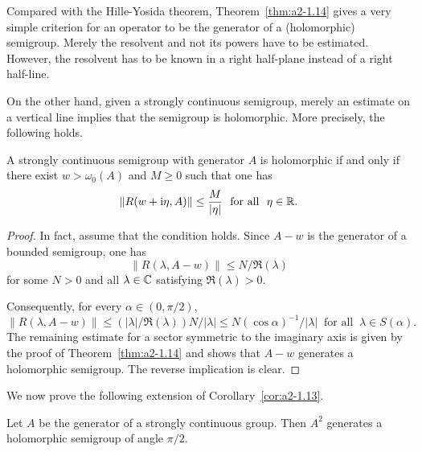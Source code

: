 Compared with the Hille-Yosida theorem, Theorem~\ref{thm:a2-1.14}   gives a very simple criterion for an operator to be the generator of a (holomorphic) semigroup.
Merely the resolvent and not its powers have to be
estimated.
However, the resolvent has to be known in a right half-plane instead of a right half-line.

On the other hand, given a strongly continuous semigroup, merely an estimate on a vertical line implies that the semigroup is holomorphic.
More precisely, the following holds.
\begin{corollary*}\label{cor:a2-1.14-kgk}
A strongly continuous semigroup with generator $A$ is holomorphic if and only if there exist $w > \omega_{0}(A)$ and $M \geq 0$ such that one has
\[
    \|R(w+\im\eta,A)\| \leq \frac{M}{|\eta|}  \ \text{ for all }\ \eta \in \R.
\]
\end{corollary*}
\begin{proof}
In fact, assume that the condition holds.
Since $A-w$ is the generator of a bounded semigroup, one has 
%
\[
	\|R(\lambda,A-w)\| \leq N/\Re(\lambda)
\]
%
for some $N > 0$ and all $\lambda \in \mathbb{C}$ satisfying $\Re(\lambda) > 0$.

Consequently, for every $\alpha \in (0,\pi/2)$, 
\[
\|R(\lambda,A-w)\| \leq (|\lambda|/\Re(\lambda))N/|\lambda| \leq N(\cos\alpha)^{-1}/|\lambda| 
 \ \text{ for all }\ \lambda \in S(\alpha) .
\]
The remaining estimate for a sector symmetric to the imaginary axis is given by the proof of Theorem~\ref{thm:a2-1.14} and shows that $A-w$ generates a holomorphic semigroup.
The reverse implication is clear.
\end{proof}
We now prove the following extension of Corollary~\ref{cor:a2-1.13}.
\begin{theorem}\label{thm:a2-1.15}
Let $A$ be the generator of a strongly continuous group.
Then $A^2$ generates a holomorphic semigroup of angle $\pi/2$.
\end{theorem}
